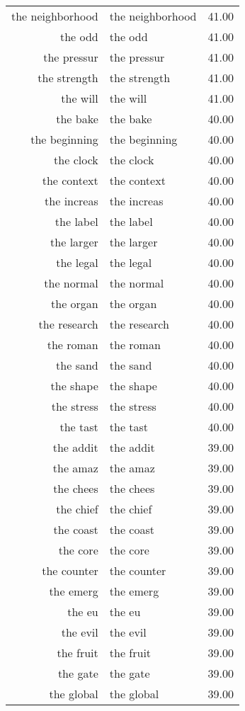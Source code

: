\begin{table}[ht]
\begin{tabular}{rlr}
  the neighborhood & the neighborhood & 41.00 \\ 
  the odd & the odd & 41.00 \\ 
  the pressur & the pressur & 41.00 \\ 
  the strength & the strength & 41.00 \\ 
  the will & the will & 41.00 \\ 
  the bake & the bake & 40.00 \\ 
  the beginning & the beginning & 40.00 \\ 
  the clock & the clock & 40.00 \\ 
  the context & the context & 40.00 \\ 
  the increas & the increas & 40.00 \\ 
  the label & the label & 40.00 \\ 
  the larger & the larger & 40.00 \\ 
  the legal & the legal & 40.00 \\ 
  the normal & the normal & 40.00 \\ 
  the organ & the organ & 40.00 \\ 
  the research & the research & 40.00 \\ 
  the roman & the roman & 40.00 \\ 
  the sand & the sand & 40.00 \\ 
  the shape & the shape & 40.00 \\ 
  the stress & the stress & 40.00 \\ 
  the tast & the tast & 40.00 \\ 
  the addit & the addit & 39.00 \\ 
  the amaz & the amaz & 39.00 \\ 
  the chees & the chees & 39.00 \\ 
  the chief & the chief & 39.00 \\ 
  the coast & the coast & 39.00 \\ 
  the core & the core & 39.00 \\ 
  the counter & the counter & 39.00 \\ 
  the emerg & the emerg & 39.00 \\ 
  the eu & the eu & 39.00 \\ 
  the evil & the evil & 39.00 \\ 
  the fruit & the fruit & 39.00 \\ 
  the gate & the gate & 39.00 \\ 
  the global & the global & 39.00 \\ 

\end{tabular}
\end{table}
